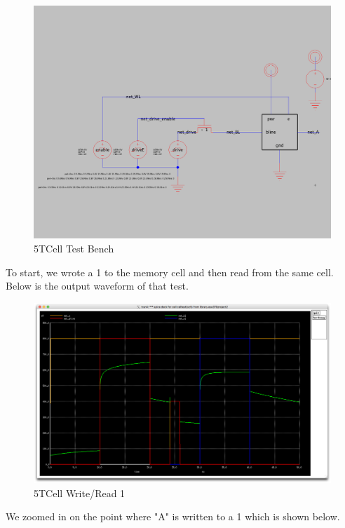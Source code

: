 \documentclass[a4paper]{article}
\begin{document}
\begin{figure}[H]
	\centering
	\includegraphics[scale=0.2]{5TCellTest}
	\caption{5TCell Test Bench}
	\label{fig:5TCellTest}
\end{figure}

 To start, we wrote a 1 to the memory cell and then read from the same cell. Below is the output waveform of that test.\\
 
 \begin{figure}[H]
	\centering
	\includegraphics[scale=0.12]{5TWR1}
	\caption{5TCell Write/Read 1}
	\label{fig:5TWR1}
\end{figure}
We zoomed in on the point where "A" is written to a 1 which is shown below.\\
\end{document}
